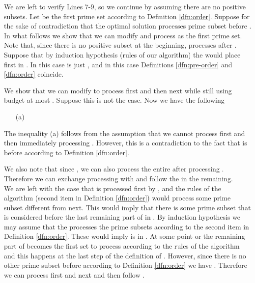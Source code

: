 \documentclass[letterpaper,11pt,abstracton]{scrartcl}
\begin{document}
We are left to verify Lines 7-9, so we continue by assuming there are
no positive subsets. Let  be the first prime set according to Definition \ref{dfn:order}.
Suppose for the sake of contradiction that the optimal solution  processes
prime subset  before . In what follows we show that we can modify  and process  as the first prime set. Note that, since there is no positive subset at the beginning,  processes  after .\\




Suppose that by induction hypothesis (rules of our algorithm) the 
would place  first in . In this case 
is just , and in this case Definitions \ref{dfn:pre-order} and
\ref{dfn:order} coincide.


We show that we can modify  to process  first and then
 next while still using budget at most . Suppose this is not the
case. Now we have the following

\begin{itemize}


\item [(a)] 

\end{itemize}



The inequality (a) follows from the assumption that we cannot process  first and then immediately processing
. However, this is a contradiction to the fact that  is before  according to Definition \ref{dfn:order}.

We also note that since , we can also process
the entire  after processing . Therefore we can exchange processing  with  and follow the
 in the remaining. \\



We are left with the case that  is processed first by , and the rules
of the algorithm (second item in Definition \ref{dfn:order}) would process some prime subset  different from  next.
This would imply that there is some prime subset  that is considered before the last remaining part of  in .
By induction hypothesis we may assume that the  processes the prime subsets according to the second item in Definition \ref{dfn:order}.
These would imply  is in .  At some point  or the remaining part of  becomes the first set to process according to
the rules of the algorithm and this happens at the last step of the definition of  .
However, since there is no other prime subset before  according to Definition \ref{dfn:order} we have
. Therefore  we can process   first and next
 and then follow .
\end{document}
